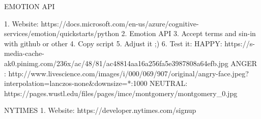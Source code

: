 EMOTION API

1. Website: https://docs.microsoft.com/en-us/azure/cognitive-services/emotion/quickstarts/python
2. Emotion API
3. Accept terms and sin-in with github or other
4. Copy script
5. Adjust it ;)
6. Test it: 
HAPPY: https://s-media-cache-ak0.pinimg.com/236x/ac/48/81/ac48814aa16a256fa5e3987808a64efb.jpg
ANGER : http://www.livescience.com/images/i/000/069/907/original/angry-face.jpeg?interpolation=lanczos-none&downsize=*:1000
NEUTRAL: https://pages.wustl.edu/files/pages/imce/montgomery/montgomery_0.jpg

NYTIMES
1. Website: https://developer.nytimes.com/signup


